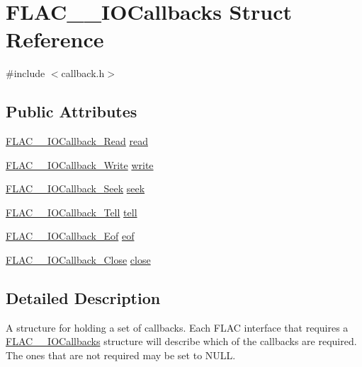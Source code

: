 \hypertarget{struct_f_l_a_c_____i_o_callbacks}{}\section{F\+L\+A\+C\+\_\+\+\_\+\+I\+O\+Callbacks Struct Reference}
\label{struct_f_l_a_c_____i_o_callbacks}


{\ttfamily \#include $<$callback.\+h$>$}

\subsection*{Public Attributes}
\begin{DoxyCompactItemize}
\item 
\mbox{\hyperlink{group__flac__callbacks_ga49d95218a6c09b215cd92cc96de71bf9}{F\+L\+A\+C\+\_\+\+\_\+\+I\+O\+Callback\+\_\+\+Read}} \mbox{\hyperlink{struct_f_l_a_c_____i_o_callbacks_a6dd767bc254e31dc47c9a0d218e72190}{read}}
\item 
\mbox{\hyperlink{group__flac__callbacks_gad991792235879aecae289b56a112e1b8}{F\+L\+A\+C\+\_\+\+\_\+\+I\+O\+Callback\+\_\+\+Write}} \mbox{\hyperlink{struct_f_l_a_c_____i_o_callbacks_ad64901e5a5710ee4c3c157c75d51ddc0}{write}}
\item 
\mbox{\hyperlink{group__flac__callbacks_gab3942bbbd6ae09bcefe7cb3a0060c49c}{F\+L\+A\+C\+\_\+\+\_\+\+I\+O\+Callback\+\_\+\+Seek}} \mbox{\hyperlink{struct_f_l_a_c_____i_o_callbacks_aa1a6f4623965a2d9fcc09b92fabaa1ee}{seek}}
\item 
\mbox{\hyperlink{group__flac__callbacks_ga45314930cabc2e9c04867eae6bca309f}{F\+L\+A\+C\+\_\+\+\_\+\+I\+O\+Callback\+\_\+\+Tell}} \mbox{\hyperlink{struct_f_l_a_c_____i_o_callbacks_a8ff0d175a7b3e9318270e305918df827}{tell}}
\item 
\mbox{\hyperlink{group__flac__callbacks_ga00ae3b3d373e691908e9539ebf720675}{F\+L\+A\+C\+\_\+\+\_\+\+I\+O\+Callback\+\_\+\+Eof}} \mbox{\hyperlink{struct_f_l_a_c_____i_o_callbacks_a4810838b77667dc02415c854b2103e66}{eof}}
\item 
\mbox{\hyperlink{group__flac__callbacks_ga0032267fac38220689778833e08f7387}{F\+L\+A\+C\+\_\+\+\_\+\+I\+O\+Callback\+\_\+\+Close}} \mbox{\hyperlink{struct_f_l_a_c_____i_o_callbacks_a8e447ae1999d9da9ebad5417f47223be}{close}}
\end{DoxyCompactItemize}


\subsection{Detailed Description}
A structure for holding a set of callbacks. Each F\+L\+AC interface that requires a \mbox{\hyperlink{struct_f_l_a_c_____i_o_callbacks}{F\+L\+A\+C\+\_\+\+\_\+\+I\+O\+Callbacks}} structure will describe which of the callbacks are required. The ones that are not required may be set to N\+U\+LL.

